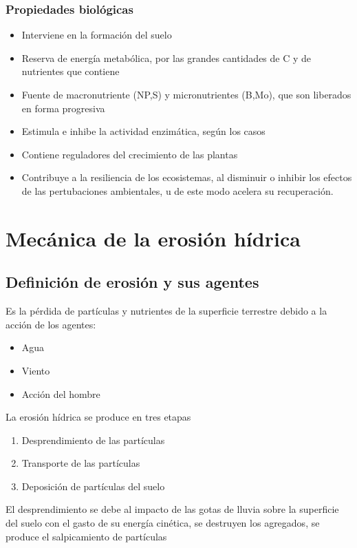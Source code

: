     \subsubsection{Propiedades biológicas}
    \begin{itemize}
        \item Interviene en la formación del suelo
        \item Reserva de energía metabólica, por las grandes cantidades de C y de nutrientes que contiene
        \item Fuente de macronutriente (NP,S) y micronutrientes (B,Mo), que son liberados en forma progresiva
        \item Estimula e inhibe la actividad enzimática, según los casos
        \item Contiene reguladores del crecimiento de las plantas
        \item Contribuye a la resiliencia de los ecosistemas, al disminuir o inhibir los efectos de las pertubaciones ambientales, u de este modo acelera su recuperación.
    \end{itemize}

    \section{Mecánica de la erosión hídrica}

    \subsection{Definición de erosión y sus agentes}
    \begin{definition}[Erosión]
        Es la pérdida de partículas y nutrientes de la superficie terrestre debido a la acción de los agentes: \begin{itemize}
            \item Agua
            \item Viento
            \item Acción del hombre
        \end{itemize}
    \end{definition}
    La erosión hídrica se produce en tres etapas
    \begin{enumerate}
        \item Desprendimiento de las partículas
        \item Transporte de las partículas
        \item Deposición de partículas del suelo
    \end{enumerate}
    El desprendimiento se debe al impacto de las gotas de lluvia sobre la superficie del suelo con el gasto de su energía cinética, se destruyen los agregados, se produce el salpicamiento de partículas
    
